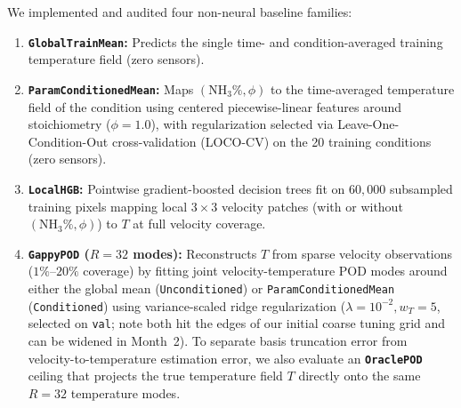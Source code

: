 \documentclass[11pt,letterpaper]{article}
\begin{document}
We implemented and audited four non-neural baseline families:
\begin{enumerate}
    \item \textbf{\texttt{GlobalTrainMean}:} Predicts the single time- and condition-averaged training temperature field (zero sensors).
    \item \textbf{\texttt{ParamConditionedMean}:} Maps $(\text{NH}_3\%, \phi)$ to the time-averaged temperature field of the condition using centered piecewise-linear features around stoichiometry ($\phi = 1.0$), with regularization selected via Leave-One-Condition-Out cross-validation (LOCO-CV) on the 20 training conditions (zero sensors).
    \item \textbf{\texttt{LocalHGB}:} Pointwise gradient-boosted decision trees fit on $60{,}000$ subsampled training pixels mapping local $3 \times 3$ velocity patches (with or without $(\text{NH}_3\%, \phi)$) to $T$ at full velocity coverage.
    \item \textbf{\texttt{GappyPOD} ($R=32$ modes):} Reconstructs $T$ from sparse velocity observations ($1\%\text{--}20\%$ coverage) by fitting joint velocity-temperature POD modes around either the global mean (\texttt{Unconditioned}) or \texttt{ParamConditionedMean} (\texttt{Conditioned}) using variance-scaled ridge regularization ($\lambda = 10^{-2}, w_T = 5$, selected on \texttt{val}; note both hit the edges of our initial coarse tuning grid and can be widened in Month~2). To separate basis truncation error from velocity-to-temperature estimation error, we also evaluate an \textbf{\texttt{OraclePOD}} ceiling that projects the true temperature field $T$ directly onto the same $R=32$ temperature modes.
\end{enumerate}
\end{document}
